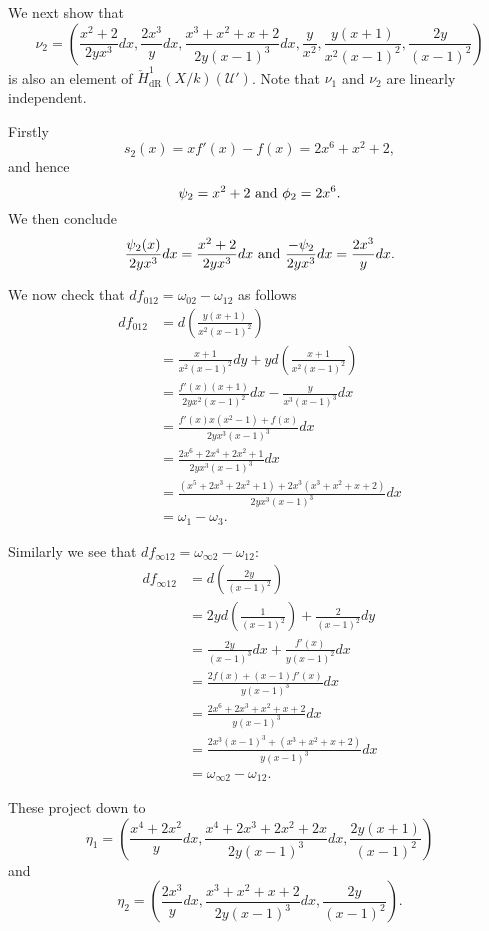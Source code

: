 \documentclass[draft, 11pt]{article} %
\theoremstyle{plain}
\theoremstyle{remark}
\newcommand{\cU}{{\mathcal U}}
\newcommand{\cechderhamhone}{\check{H}_{\text {dR}}^1(X/k)}
\begin{document}
We next show that
\[
\nu_2 = \left( \frac{x^2+2}{2yx^3}dx, \frac{2x^3}{y}dx, \frac{x^3+x^2+x+2}{2y(x-1)^3}dx, \frac{y}{x^2}, \frac{y(x+1)}{x^2(x-1)^2}, \frac{2y}{(x-1)^2} \right) 
\]
is also an element of $\cechderhamhone(\cU')$.
Note that $\nu_1$ and $\nu_2$ are linearly independent.

Firstly
\[
s_2(x) = xf'(x) - f(x) = 2x^6 + x^2 +2,
\]
and hence
\[
\psi_2 = x^2 + 2 \ {\rm and} \ \phi_2 = 2x^6.
\]
We then conclude
\[
\frac{\psi_2(x)}{2yx^3}dx = \frac{x^2+2}{2yx^3}dx \ {\rm and} \ \frac{-\psi_2}{2yx^3}dx = \frac{2x^3}{y}dx.
\]

We now check that $df_{0 1 2} = \omega_{0 2} - \omega_{1 2}$ as follows
\begin{align*}
df_{0 1 2} & = d\left(\frac{y(x+1)}{x^2(x-1)^2} \right) \\
& = \frac{x+1}{x^2(x-1)^2}dy + y d\left( \frac{x+1}{x^2(x-1)^2} \right) \\
& = \frac{f'(x)(x+1)}{2yx^2(x-1)^2} dx - \frac{y}{x^3(x-1)^3}dx \\
& = \frac{f'(x)x(x^2-1) + f(x)}{2yx^3(x-1)^3}dx \\
& = \frac{2x^6 + 2x^4 + 2x^2 +1}{2yx^3(x-1)^3} dx \\
& = \frac{(x^5 + 2x^3 + 2x^2 + 1) + 2x^3(x^3 + x^2 + x + 2)}{2yx^3(x-1)^3}dx \\
& = \omega_1 - \omega_3.
\end{align*}

Similarly we see that $df_{\infty 1 2} = \omega_{\infty 2} - \omega_{1 2}$:
\begin{align*}
df_{\infty 1 2} & = d \left( \frac{2y}{(x-1)^2} \right) \\
& = 2y d\left( \frac{1}{(x-1)^2} \right) + \frac{2}{(x-1)^2} dy \\
& = \frac{2y}{(x-1)^3}dx + \frac{f'(x)}{y(x-1)^2}dx \\
& = \frac{2f(x) + (x-1)f'(x)}{y(x-1)^3} dx \\
& = \frac{2x^6 + 2x^3 + x^2 + x + 2}{y(x-1)^3} dx \\
& = \frac{2x^3(x-1)^3 + (x^3 + x^2 + x + 2)}{y(x-1)^3}dx \\
& = \omega_{\infty 2} - \omega_{12}.
\end{align*}

These project down to 
\[
\eta_1 = \left( \frac{x^4 + 2x^2}{y}dx , \frac{x^4 + 2x^3 + 2x^2 + 2x}{2y(x-1)^3}dx, \frac{2y(x+1)}{(x-1)^2} \right)
\]
and
\[
\eta_2 = \left(\frac{2x^3}{y}dx, \frac{x^3+x^2+x+2}{2y(x-1)^3}dx, \frac{2y}{(x-1)^2} \right).
\]
\end{document}
